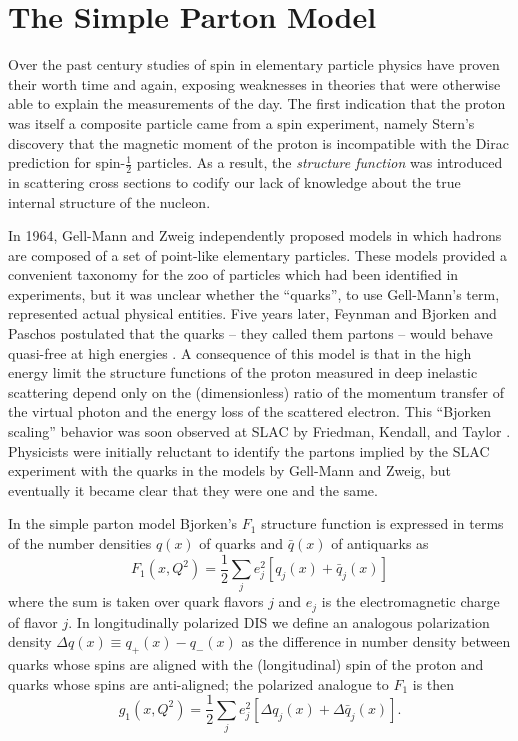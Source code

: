 \section{The Simple Parton Model}

Over the past century studies of spin in elementary particle physics have proven
their worth time and again, exposing weaknesses in theories that were otherwise
able to explain the measurements of the day. The first indication that the
proton was itself a composite particle came from a spin experiment, namely
Stern's discovery that the magnetic moment of the proton is incompatible with
the Dirac prediction for spin-\(\frac{1}{2}\) particles. As a result, the
\textit{structure function} was introduced in scattering cross sections to
codify our lack of knowledge about the true internal structure of the nucleon.

In 1964, Gell-Mann and Zweig independently proposed models
\cite{GellMann:1964nj, Zweig:1964jf} in which hadrons are composed of a set of
point-like elementary particles. These models provided a convenient taxonomy for
the zoo of particles which had been identified in experiments, but it was
unclear whether the ``quarks'', to use Gell-Mann's term, represented actual
physical entities. Five years later, Feynman and Bjorken and Paschos postulated
that the quarks -- they called them partons -- would behave quasi-free at high
energies \cite{Feynman:1969ej, Bjorken:1969ja}. A consequence of this model is
that in the high energy limit the structure functions of the proton measured in
deep inelastic scattering depend only on the (dimensionless) ratio of the
momentum transfer of the virtual photon and the energy loss of the scattered
electron. This ``Bjorken scaling'' behavior was soon observed at SLAC by
Friedman, Kendall, and Taylor \cite{Breidenbach:1969kd}. Physicists were
initially reluctant to identify the partons implied by the SLAC experiment with
the quarks in the models by Gell-Mann and Zweig, but eventually it became clear
that they were one and the same.

In the simple parton model Bjorken's $F_1$ structure function is expressed in
terms of the number densities $q(x)$ of quarks and $\bar q(x)$ of antiquarks
as
%
\begin{equation}
  F_1(x, Q^2) = \frac{1}{2}\sum_{j}{e_j^2[q_j(x) + \bar{q}_j(x)]}
\end{equation}
%
where the sum is taken over quark flavors $j$ and $e_j$ is the electromagnetic
charge of flavor $j$. In longitudinally polarized DIS we define an analogous
polarization density $\Delta q(x) \equiv q_+(x) - q_-(x)$ as the difference in
number density between quarks whose spins are aligned with the (longitudinal)
spin of the proton and quarks whose spins are anti-aligned; the polarized
analogue to $F_1$ is then
%
\begin{equation}
  g_1(x, Q^2) = \frac{1}{2}\sum_{j}{e_j^2[\Delta q_j(x) + \Delta \bar{q}_j(x)]}.
  \label{eqn:simple-g1}
\end{equation}


